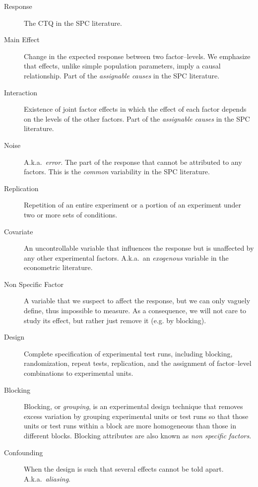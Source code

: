 \documentclass[12pt,a4paper]{report}
\theoremstyle{plain}
\theoremstyle{definition}
\newcommand{\Aka}{{A.k.a.\ }}
\begin{document}
\begin{description}
\item [Response] The CTQ in the SPC literature. 

\item [Main Effect] Change in the expected response between two factor–levels.  
We emphasize that effects, unlike simple population parameters, imply a causal relationship.
Part of the \emph{assignable causes} in the SPC literature.

\item [Interaction] Existence of joint factor effects in which the effect of each factor depends on the levels of the other factors.
Part of the \emph{assignable causes} in the SPC literature.

\item [Noise] \Aka \emph{error}. The part of the response that cannot be attributed to any factors.
This is the \emph{common} variability in the SPC literature.

\item [Replication] Repetition of an entire experiment or a portion of an experiment under two or more sets of conditions.

\item [Covariate]  An uncontrollable variable that influences the response but is unaffected by any other experimental factors.
\Aka an \emph{exogenous} variable in the econometric literature.

\item [Non Specific Factor] A variable that we suspect to affect the response, but we can only vaguely define, thus impossible to measure. As a consequence, we will not care to study its effect, but rather just remove it (e.g. by blocking). 


\item [Design]  Complete specification of experimental test runs, including blocking, randomization, repeat tests, replication, and the assignment of factor–level combinations to experimental units.

\item [Blocking]  Blocking, or \emph{grouping}, is an experimental design technique that removes excess variation by grouping experimental units or test runs so that those units or test runs within a block are more homogeneous than those in different blocks. Blocking attributes are also known as \emph{non specific factors}.

\item [Confounding] When the design is such that several effects cannot be told apart. \Aka \emph{aliasing}.


\end{description}
\end{document}
